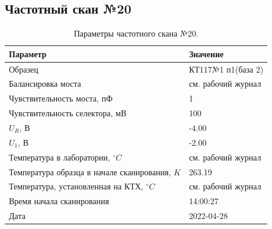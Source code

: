 \subsection{Частотный скан №20}
\begin{table}[!ht]
    \centering
    \caption{Параметры частотного скана №20.}
    \begin{tabular}{|l|l|}
        \hline
        Параметр                                       & Значение                  \\ \hline
        Образец                                        & КТ117№1 п1(база 2)        \\ \hline
        Балансировка моста                             & см. рабочий журнал        \\ \hline
        Чувствительность моста, пФ                     & 1                         \\ \hline
        Чувствительность селектора, мВ                 & 100                       \\ \hline
        $U_R$, В                                       & -4.00                     \\ \hline
        $U_1$, В                                       & -2.00                     \\ \hline
        Температура в лаборатории, $^\circ C$          & см. рабочий журнал        \\ \hline
        Температура образца в начале сканирования, $K$ & 263.19                    \\ \hline
        Температура, установленная на КТХ, $^\circ C$  & см. рабочий журнал        \\ \hline
        Время начала сканирования                      & 14:00:27                  \\ \hline
        Дата                                           & 2022-04-28                \\ \hline
    \end{tabular}
    \label{table:frequency_scan_20}
\end{table}

